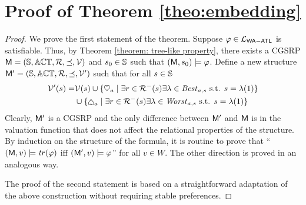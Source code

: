 \section{Proof of Theorem \ref{theo:embedding} }\label{sec: embeding perserve satifability}\label{sec:app:embedding}
\label{sec: Proof for embedding}

\begin{proof} 
We prove the 
first statement of the theorem. 
Suppose $\varphi \in \mathcal{L}_{\mathsf{WA{-}ATL}} $
is satisfiable.
Thus, by Theorem \ref{theorem: tree-like property},
there exists a CGSRP
$\mathsf{M}=(\mathbb{S},  \mathbb{ACT},  \mathcal{R}, \preceq, \mathcal{V})$ 
  and $s_0 \in \mathbb{S} $
  such that $(\mathsf{M},s_0 )\models \varphi $. 
  Define a new structure
  $\mathsf{M}'=(\mathbb{S},  \mathbb{ACT},  \mathcal{R}, \preceq, \mathcal{V}')$
 such that for all $s\in \mathbb{S}$
  \begin{align*}
    \V'(s)= &\V(s)\cup \{\help_a\mid \exists r\in \R^-(s)
     \exists \history \in \Best_{a,s}\text{ s.t. } s= \history(1)\}\\
     &\cup \{\harm_a\mid \exists r\in \R^-(s)
     \exists \history \in \Worst_{a,s}\text{ s.t. } s= \history(1)\}
  \end{align*}
Clearly, $\mathsf{M}' $ is a CGSRP
and the only difference between $\mathsf{M}'$
and $\mathsf{M}$
is in the valuation function 
that does not affect the relational properties
of the structure. 
By induction on the structure of the formula,
it is routine to prove that 
``$(\mathsf{M},v )\models \mathit{tr}( \varphi )$ iff
  $(\mathsf{M}',v )\models \varphi $'' for all $v \in W$.
  The other direction is proved in an analogous way. 

The proof of
the second statement is based 
on a straightforward adaptation of the above construction without requiring stable preferences.
\end{proof}

